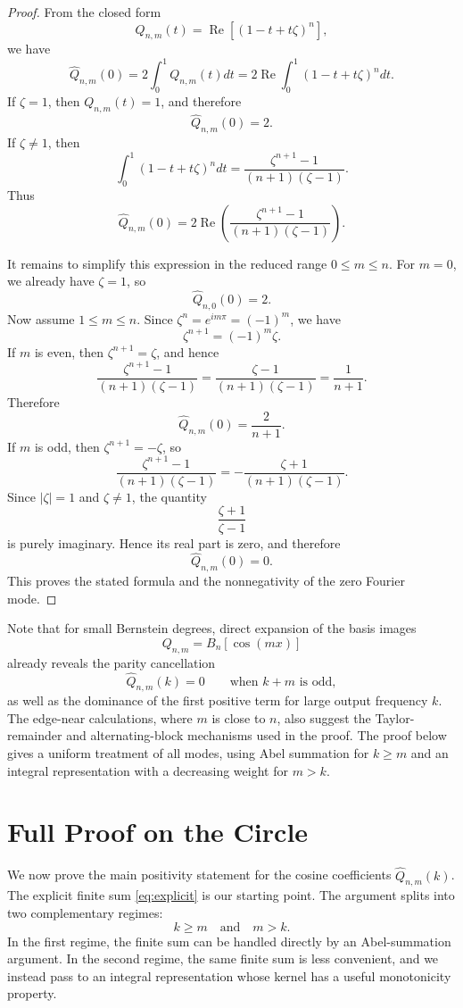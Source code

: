 \documentclass[a4paper,12pt]{amsart}
\theoremstyle{definition}
\theoremstyle{remark}
\DeclareMathOperator{\RealPart}{Re}
\renewcommand{\Re}{\RealPart}
\begin{document}
\begin{proof}
From the closed form
\[
Q_{n,m}(t)= \Re[( 1-t+t\zeta )^n],
\]
we have
\[
\widehat Q_{n,m}(0)
=
2\int_0^1 Q_{n,m}(t) dt
=
2\Re\int_0^1 (1-t+t\zeta)^n dt.
\]
If $\zeta = 1$, then $Q_{n,m}(t) = 1$, and therefore
\[
\widehat Q_{n,m}(0)=2.
\]
If $\zeta \ne 1$, then
\[
\int_0^1 (1-t+t\zeta)^n dt
=
\frac{\zeta^{n+1}-1}{(n+1)(\zeta - 1)}.
\]
Thus
\[
\widehat Q_{n,m}(0)
=
2\Re\!\left(
\frac{\zeta^{n+1}-1}{(n+1)(\zeta -1)}
\right).
\]

It remains to simplify this expression in the reduced range $0\le m\le n$.
For $m=0$, we already have $\zeta=  1$, so
\[
\widehat Q_{n,0}(0) = 2.
\]
Now assume $1\le m\le n$. Since $\zeta^n = e^{ im\pi } = (-1)^m$, we have
\[
\zeta^{n+1} = (-1)^m\zeta.
\]
If $m$ is even, then $\zeta^{n+1} = \zeta$, and hence
\[
\frac{\zeta^{n+1}-1}{(n+1)(\zeta-1)}
=
\frac{\zeta-1}{(n+1)(\zeta-1)}
=
\frac{1}{n+1}.
\]
Therefore
\[
\widehat Q_{n,m}(0) = \frac{2}{n+1}.
\]
If $m$ is odd, then $\zeta^{n+1} = -\zeta$, so
\[
\frac{\zeta^{n+1}-1}{(n+1)(\zeta-1)}
=
-\frac{\zeta+1}{(n+1)(\zeta-1)}.
\]
Since $|\zeta|=1$ and $\zeta\ne1$, the quantity
\[
\frac{\zeta+1}{\zeta-1}
\]
is purely imaginary. Hence its real part is zero, and therefore
\[
\widehat Q_{n,m}(0) =0.
\]
This proves the stated formula and the nonnegativity of the zero Fourier mode.
\end{proof}

Note that for small Bernstein degrees, direct expansion of the basis images 
\[
Q_{n,m}=B_n[\cos(mx)] 
\] 
already reveals the parity cancellation 
\[ 
\widehat Q_{n,m}(k)=0 \qquad\text{when }k+m\text{ is odd}, 
\] 
as well as the dominance of the first positive term for large output frequency $k$. The edge-near calculations, where $m$ is close to $n$, also suggest the Taylor-remainder and alternating-block mechanisms used in the proof. The proof below gives a uniform treatment of all modes, using Abel summation for $k\ge m$ and an integral representation with a decreasing weight for $m>k$.


\section{Full Proof on the Circle}
\label{sec:full-proof-circle}

We now prove the main positivity statement for the cosine coefficients $\widehat Q_{n,m}(k)$. The explicit finite sum \eqref{eq:explicit} is our starting point. The argument splits into two complementary regimes:
\[
k \ge m
\quad \text{and} \quad
m > k.
\]
In the first regime, the finite sum can be handled directly by an Abel-summation argument. In the second regime, the same finite sum is less convenient, and we instead pass to an integral representation whose kernel has a useful monotonicity property.
\end{document}
